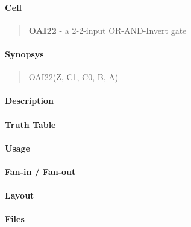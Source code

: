 \label{OAI22}
\paragraph{Cell}
\begin{quote}
    \textbf{OAI22} - a 2-2-input OR-AND-Invert gate
\end{quote}

\paragraph{Synopsys}
\begin{quote}
    OAI22(Z, C1, C0, B, A)
\end{quote}

\paragraph{Description}



\paragraph{Truth Table}


\paragraph{Usage}

\paragraph{Fan-in / Fan-out}

\paragraph{Layout}

\paragraph{Files}
